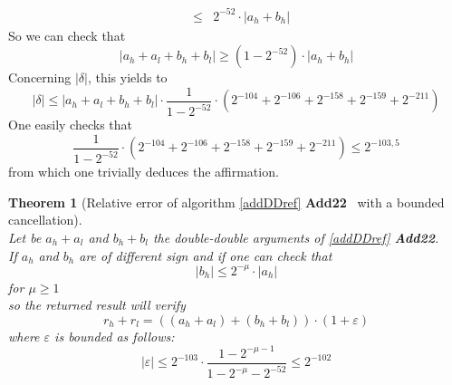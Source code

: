 \documentclass[a4paper,10pt,twoside]{article}
\newtheorem{theorem}{Theorem}[section]
\newenvironment{proof}[1][Proof]{\begin{trivlist}
\item[\hskip \labelsep {\bfseries #1}]}{\end{trivlist}}
\newcommand{\qed}{\nobreak \ifvmode \relax \else \ifdim \lastskip<1.5em \hskip-\lastskip
\hskip1.5em plus0em minus0.5em \fi \nobreak \vrule height0.75em width0.5em depth0.25em\fi}
\newcommand{\hi}{\ensuremath{\mathit{h}}}
\newcommand{\lo}{\ensuremath{\mathit{l}}}
\newcommand{\AddDD}{{\bf Add22}}
\renewcommand{\epsilon}{\varepsilon}
\begin{document}
\begin{proof}
\begin{eqnarray*}
& \leq & 2^{-52} \cdot \left \vert a_\hi + b_\hi \right \vert 
\end{eqnarray*}
So we can check that
$$\left \vert a_\hi + a_\lo + b_\hi + b_\lo \right \vert \geq \left( 1 - 2^{-52} \right) \cdot \left \vert a_\hi + b_\hi \right \vert$$
Concerning $\left \vert \delta \right \vert$, this yields to
$$\left \vert \delta \right \vert \leq 
\left \vert a_\hi + a_\lo + b_\hi + b_\lo \right \vert \cdot \frac{1}{1-2^{-52}} \cdot 
\left( 2^{-104} + 2^{-106} + 2^{-158} + 2^{-159} + 2^{-211} \right)$$
One easily checks that 
$$ \frac{1}{1-2^{-52}} \cdot \left( 2^{-104} + 2^{-106} + 2^{-158} + 2^{-159} + 2^{-211} \right) \leq 2^{-103,5}$$
from which one trivially deduces the affirmation.\qed
\end{proof}
\begin{theorem}[Relative error of algorithm \ref{addDDref} \AddDD~ with a
    bounded cancellation\label{theoAddDDrefborn}] ~ \\
Let be $a_\hi + a_\lo$ and $b_\hi + b_\lo$ the double-double arguments of \ref{addDDref} \AddDD.\\
If $a_\hi$ and $b_\hi$ are of different sign and if one can check that
$$\left \vert b_\hi \right \vert \leq 2^{-\mu} \cdot \left \vert a_\hi \right
\vert$$ for $\mu \geq 1$ \\
so the returned result will verify 
$$r_\hi + r_\lo = \left(\left(a_\hi + a_\lo \right) + \left( b_\hi + b_\lo \right)\right) \cdot \left(1 + \epsilon\right)$$
where $\epsilon$ is bounded as follows:
$$\left \vert \epsilon \right \vert \leq 2^{-103}\cdot \frac{1-2^{-\mu - 1}}{1-2^{-\mu}-2^{-52}} \leq 2^{-102}$$
\end{theorem}
\end{document}
